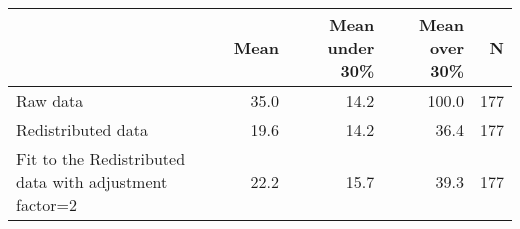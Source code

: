 \begin{table}[ht]
\centering
\begin{tabular}{lrrrr}
  \hline
 & Mean & Mean under 30\% & Mean over 30\% & N \\ 
  \hline
Raw data & 35.0 & 14.2 & 100.0 & 177 \\ 
  Redistributed data & 19.6 & 14.2 & 36.4 & 177 \\ 
  Fit to the Redistributed data with adjustment factor=2 & 22.2 & 15.7 & 39.3 & 177 \\ 
   \hline
\end{tabular}
\end{table}
